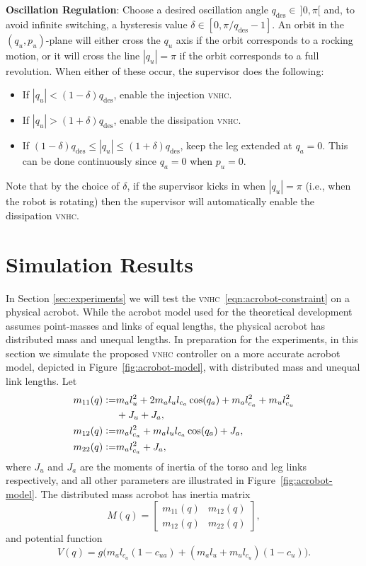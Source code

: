 \documentclass[journal,twoside,web, twocolumn,draftcls]{ieeecolor}
\newcommand*{\eqdef}{\vcentcolon=}
\newcommand*{\vnhc}{\textsc{vnhc}\xspace}
\begin{document}
\textbf{Oscillation Regulation}: Choose a desired oscillation angle  \(q_\text{des} \in \, ]0,\pi[\) and, to avoid infinite switching, a hysteresis value \(\delta \in [0,\pi/q_\text{des} - 1]\). An orbit in the \((q_u,p_u)\)-plane will either cross the \(q_u\) axis if the orbit corresponds to a rocking motion, or it will cross the line \(|q_u| = \pi\) if the orbit corresponds to a full revolution. When either of these occur, the supervisor does the following: 
\begin{itemize}
    \item If \(|q_u| < (1-\delta)q_\text{des}\), enable the injection \vnhc.
    \item If \(|q_u| > (1+\delta)q_\text{des}\), enable the dissipation \vnhc.
    \item If \((1-\delta)q_\text{des} \leq |q_u| \leq (1+\delta)q_\text{des}\),
        keep the leg extended at \(q_a = 0\). This can be done continuously since
        \(q_a = 0\) when \(p_u = 0\).
\end{itemize}
Note that by the choice of \(\delta\), if the supervisor kicks in when  \(|q_u| = \pi\) (i.e., when the robot is rotating) then the supervisor will automatically enable the dissipation \vnhc.


\section{Simulation Results}\label{sec:simulations}
In Section \ref{sec:experiments} we will test the \vnhc~\eqref{eqn:acrobot-constraint} on a physical acrobot. While the acrobot model used for the theoretical development assumes point-masses and links of equal lengths, the physical acrobot has distributed mass and unequal lengths. In preparation for the experiments, in this section we simulate the proposed \vnhc controller on a more accurate acrobot model, depicted in Figure~\ref{fig:acrobot-model}, with distributed mass and unequal link lengths. Let
\begin{align*}
    m_{11}(q) \eqdef &m_a l_u^2 + 2m_al_ul_{c_a}\cos(q_a) + m_al_{c_a}^2 +
    m_ul_{c_u}^2 \\
                 &+ J_u + J_a
                 , \\
    m_{12}(q) \eqdef &m_al_{c_a}^2 + m_al_ul_{c_a}\cos(q_a) + J_a
    , \\
    m_{22}(q) \eqdef &m_al_{c_a}^2 + J_a,
\end{align*}
where \(J_u\) and \(J_a\) are the moments of inertia of the torso and leg links
respectively, and all other parameters are illustrated in Figure~\ref{fig:acrobot-model}. The distributed mass acrobot has inertia matrix
\begin{equation*}
    M(q) = \begin{bmatrix}
        m_{11}(q) & m_{12}(q) \\
        m_{12}(q) & m_{22}(q)
    \end{bmatrix}
    ,
\end{equation*}
and potential function
\begin{equation*}
    V(q) = g\big(m_al_{c_a}(1-c_{ua})
    + (m_al_u + m_ul_{c_u})(1-c_u)\big)
    .
\end{equation*}
\end{document}
